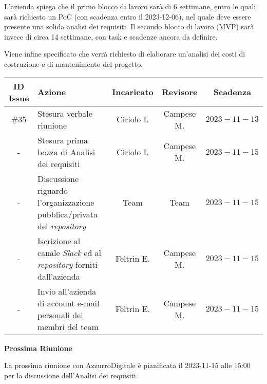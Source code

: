 \documentclass[10pt, a4paper]{article}
\begin{document}
\begin{paracol}{2}
L'azienda spiega che il primo blocco di lavoro sarà di 6 settimane, entro le quali sarà richiesto un PoC (con scadenza entro il 2023-12-06), nel quale deve essere presente una solida analisi dei requisiti. Il secondo blocco di lavoro (MVP) sarà invece di circa 14 settimane, con task e scadenze ancora da definire.

Viene infine specificato che verrà richiesto di elaborare un'analisi dei costi di costruzione e di mantenimento del progetto.

\vspace{12.5em}

\decisioni

\end{paracol}

\newpage


{\renewcommand{\arraystretch}{1.5}
\begin{tabularx}{\textwidth}{c|X|c|c|c}
\textbf{ID Issue} & \textbf{Azione} & \textbf{Incaricato} & \textbf{Revisore} & \textbf{Scadenza} \\
\hline
\#35 &
Stesura verbale riunione &
Ciriolo I. &
Campese M. &
$2023-11-13$ \\
\hline
- &
Stesura prima bozza di Analisi dei requisiti &
Ciriolo I. &
Campese M. &
$2023-11-15$ \\
\hline
- &
Discussione riguardo l'organizzazione pubblica/privata del \textit{repository} &
Team &
Team &
$2023-11-15$ \\
\hline
- &
Iscrizione al canale \textit{Slack} ed al \textit{repository} forniti dall'azienda &
Feltrin E. &
Campese M. &
$2023-11-15$ \\
\hline
- &
Invio all'azienda di account e-mail personali dei membri del team &
Feltrin E. &
Campese M. &
$2023-11-15$ \\
\end{tabularx}}

\vspace{3em}


\textbf{Prossima Riunione}

La prossima riunione con AzzurroDigitale è pianificata il 2023-11-15 alle 15:00 per la discussione dell'Analisi dei requisiti.
\end{document}
